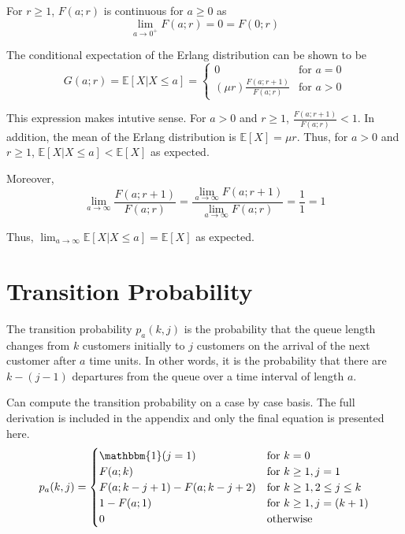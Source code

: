 For $r \geq 1$, $F (a; r)$ is continuous for $a \geq 0$ as
\begin{equation}
	\lim_{a \to 0^{+}} F (a; r) = 0 = F (0; r)
\end{equation}

The conditional expectation of the Erlang distribution can be shown to be
\begin{equation}
	G (a; r) = \mathbb{E} [X | X \leq a] = \begin{cases} 0 & \text{for $a = 0$} \\ (\mu r) \frac{F (a; r + 1)}{F (a; r)} & \text{for $a > 0$} \end{cases}
\end{equation}

This expression makes intutive sense. For $a > 0$ and $r \geq 1$, $\frac{F (a; r + 1)}{F (a; r)} < 1$. In addition, the mean of the Erlang distribution is $\mathbb{E} [X] = \mu r$. Thus, for $a > 0$ and $r \geq 1$, $\mathbb{E} [X | X \leq a] < \mathbb{E} [X]$ as expected.

Moreover, 
\begin{equation}
	\lim_{a \to \infty} \frac{F (a; r + 1)}{F (a; r)} = \frac{\displaystyle \lim_{a \to \infty} F (a; r + 1)}{\displaystyle \lim_{a \to \infty} F (a; r)} = \frac{1}{1} = 1
\end{equation}

Thus, $\displaystyle \lim_{a \to \infty} \mathbb{E} [X | X \leq a] = \mathbb{E} [X]$ as expected.

\section{Transition Probability}
The transition probability $p_{a} (k, j)$ is the probability that the queue length changes from $k$ customers initially to $j$ customers on the arrival of the next customer after $a$ time units. In other words, it is the probability that there are $k - (j - 1)$ departures from the queue over a time interval of length $a$.

 Can compute the transition probability on a case by case basis. The full derivation is included in the appendix and only the final equation is presented here.
\begin{equation}
	p_{a} (k, j) = \begin{cases}
		\mathbbm{1} (j = 1) & \text{for $k = 0$} \\
		F (a; k) & \text{for $k \geq 1, j = 1$} \\
		F (a; k - j + 1) - F (a; k - j + 2) & \text{for $k \geq 1, 2 \leq j \leq k$} \\
		1 - F (a; 1) & \text{for $k \geq 1, j = (k + 1)$} \\
		0 & \text{otherwise}
	\end{cases}
\end{equation}

